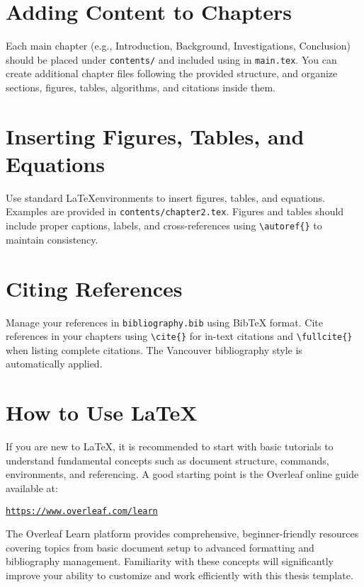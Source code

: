 \section{Adding Content to Chapters}
\begin{paragraph}
Each main chapter (e.g., Introduction, Background, Investigations, Conclusion) should be placed under \texttt{contents/} and included using \verb|| in \texttt{main.tex}. You can create additional chapter files following the provided structure, and organize sections, figures, tables, algorithms, and citations inside them.
\end{paragraph}

\section{Inserting Figures, Tables, and Equations}
\begin{paragraph}
Use standard \LaTeX environments to insert figures, tables, and equations. Examples are provided in \texttt{contents/chapter2.tex}. Figures and tables should include proper captions, labels, and cross-references using \verb|\autoref{}| to maintain consistency.
\end{paragraph}

\section{Citing References}
\begin{paragraph}
Manage your references in \texttt{bibliography.bib} using BibTeX format. Cite references in your chapters using \verb|\cite{}| for in-text citations and \verb|\fullcite{}| when listing complete citations. The Vancouver bibliography style is automatically applied.
\end{paragraph}

\section{How to Use \LaTeX}
\begin{paragraph}
If you are new to \LaTeX, it is recommended to start with basic tutorials to understand fundamental concepts such as document structure, commands, environments, and referencing. A good starting point is the Overleaf online guide available at:

\begin{center}
\href{https://www.overleaf.com/learn}{\texttt{https://www.overleaf.com/learn}}
\end{center}

The Overleaf Learn platform provides comprehensive, beginner-friendly resources covering topics from basic document setup to advanced formatting and bibliography management. Familiarity with these concepts will significantly improve your ability to customize and work efficiently with this thesis template.
\end{paragraph}

